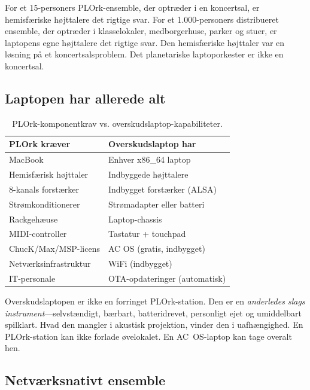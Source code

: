 \documentclass[10pt,letterpaper,twocolumn]{article}
\begin{document}
For et 15-personers PLOrk-ensemble, der optr{\ae}der i en koncertsal, er hemisf{\ae}riske h{\o}jttalere det rigtige svar. For et 1.000-personers distribueret ensemble, der optr{\ae}der i klasselokaler, medborgerhuse, parker og stuer, er laptopens egne h{\o}jttalere det rigtige svar. Den hemisf{\ae}riske h{\o}jttaler var en l{\o}sning p{\aa} et koncertsalsproblem. Det planetariske laptoporkester er ikke en koncertsal.

\subsection{Laptopen har allerede alt}

\begin{table}[h]
\small
\centering
\begin{tabular}{ll}
\toprule
\textbf{PLOrk kr{\ae}ver} & \textbf{Overskudslaptop har} \\
\midrule
MacBook & Enhver x86\_64 laptop \\
Hemisf{\ae}risk h{\o}jttaler & Indbyggede h{\o}jttalere \\
8-kanals forst{\ae}rker & Indbygget forst{\ae}rker (ALSA) \\
Str{\o}mkonditionerer & Str{\o}madapter eller batteri \\
Rackgeh{\ae}use & Laptop-chassis \\
MIDI-controller & Tastatur + touchpad \\
ChucK/Max/MSP-licens & AC OS (gratis, indbygget) \\
Netv{\ae}rksinfrastruktur & WiFi (indbygget) \\
IT-personale & OTA-opdateringer (automatisk) \\
\bottomrule
\end{tabular}
\caption{PLOrk-komponentkrav vs. overskudslaptop-kapabiliteter.}
\label{tab:plork-vs-surplus}
\end{table}

Overskudslaptopen er ikke en forringet PLOrk-station. Den er en \emph{anderledes slags instrument}---selvst{\ae}ndigt, b{\ae}rbart, batteridrevet, personligt ejet og umiddelbart spilklart. Hvad den mangler i akustisk projektion, vinder den i uafh{\ae}ngighed. En PLOrk-station kan ikke forlade {\o}velokalet. En AC~OS-laptop kan tage overalt hen.

\subsection{Netv{\ae}rksnativt ensemble}
\end{document}
